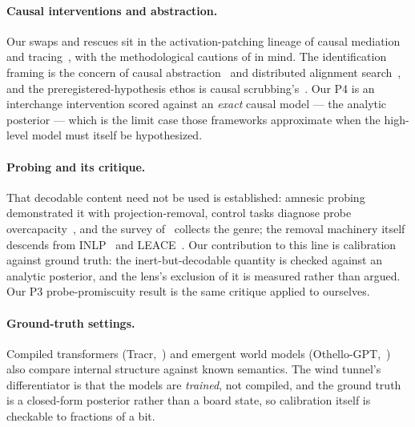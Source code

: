 \documentclass[11pt]{article}
\begin{document}
\paragraph{Causal interventions and abstraction.} Our swaps and
rescues sit in the activation-patching lineage of causal mediation and
tracing~\citep{vig2020causal, meng2022rome, wang2023ioi}, with the
methodological cautions of \citet{zhang2024patching} in mind. The
identification framing is the concern of causal
abstraction~\citep{geiger2021causal} and distributed alignment
search~\citep{geiger2024das}, and the preregistered-hypothesis ethos is
causal scrubbing's~\citep{chan2022scrubbing}. Our P4 is an interchange
intervention scored against an \emph{exact} causal model --- the
analytic posterior --- which is the limit case those frameworks
approximate when the high-level model must itself be hypothesized.

\paragraph{Probing and its critique.} That decodable content need not
be used is established: amnesic probing~\citep{elazar2021amnesic}
demonstrated it with projection-removal, control tasks diagnose probe
overcapacity~\citep{hewitt2019control}, and the survey
of~\citet{belinkov2022probing} collects the genre; the removal
machinery itself descends from INLP~\citep{ravfogel2020inlp} and
LEACE~\citep{belrose2023leace}. Our contribution to this line is
calibration against ground truth: the inert-but-decodable quantity is
checked against an analytic posterior, and the lens's exclusion of it
is measured rather than argued. Our P3 probe-promiscuity result is the
same critique applied to ourselves.

\paragraph{Ground-truth settings.} Compiled transformers
(Tracr,~\citealt{lindner2023tracr}) and emergent world models
(Othello-GPT,~\citealt{li2023othello}) also compare internal structure
against known semantics. The wind tunnel's differentiator is that the
models are \emph{trained}, not compiled, and the ground truth is a
closed-form posterior rather than a board state, so calibration itself
is checkable to fractions of a bit.
\end{document}
